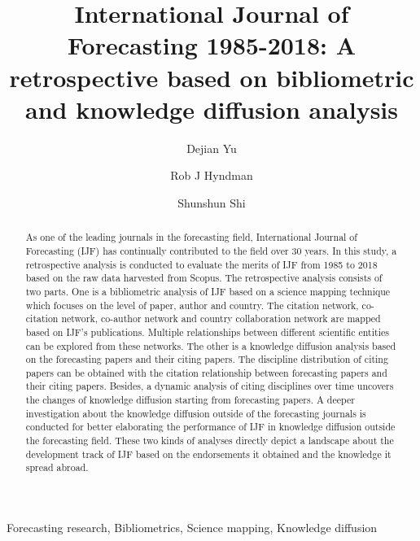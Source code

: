 \documentclass[11pt,a4paper]{elsarticle} %
\begin{document}
\begin{frontmatter}

  \title{International Journal of Forecasting 1985-2018: A retrospective based on
bibliometric and knowledge diffusion analysis}
    \author[nau]{Dejian Yu}
  
    \author[monash]{Rob J Hyndman}
  
    \author[zufe]{Shunshun Shi}
      \address[nau]{Business School, Nanjing Audit University, Nanjing 211815, China}
    \address[monash]{Department of Econometrics \& Business Statistics, Clayton, VIC 3800,
Australia}
    \address[zufe]{Information School, Zhejiang University of Finance and Economics,
Hangzhou 310016, China}
  
  \begin{abstract}
  As one of the leading journals in the forecasting field, International
  Journal of Forecasting (IJF) has continually contributed to the field
  over 30 years. In this study, a retrospective analysis is conducted to
  evaluate the merits of IJF from 1985 to 2018 based on the raw data
  harvested from Scopus. The retrospective analysis consists of two parts.
  One is a bibliometric analysis of IJF based on a science mapping
  technique which focuses on the level of paper, author and country. The
  citation network, co-citation network, co-author network and country
  collaboration network are mapped based on IJF's publications. Multiple
  relationships between different scientific entities can be explored from
  these networks. The other is a knowledge diffusion analysis based on the
  forecasting papers and their citing papers. The discipline distribution
  of citing papers can be obtained with the citation relationship between
  forecasting papers and their citing papers. Besides, a dynamic analysis
  of citing disciplines over time uncovers the changes of knowledge
  diffusion starting from forecasting papers. A deeper investigation about
  the knowledge diffusion outside of the forecasting journals is conducted
  for better elaborating the performance of IJF in knowledge diffusion
  outside the forecasting field. These two kinds of analyses directly
  depict a landscape about the development track of IJF based on the
  endorsements it obtained and the knowledge it spread abroad.
  \end{abstract}
   \begin{keyword} Forecasting research, Bibliometrics, Science mapping, Knowledge
diffusion\end{keyword}
 \end{frontmatter}
\end{document}
